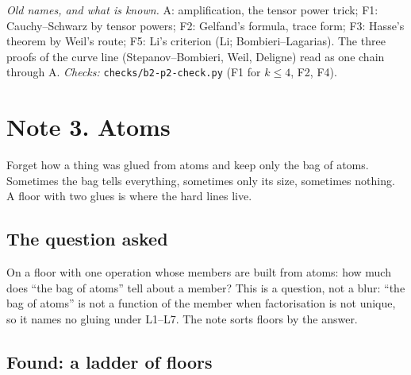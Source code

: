 \noindent\emph{Old names, and what is known.} A: amplification, the tensor power trick; F1: Cauchy--Schwarz by tensor powers; F2: Gelfand's formula, trace form; F3: Hasse's theorem by Weil's route; F5: Li's criterion (Li; Bombieri--Lagarias). The three proofs of the curve line (Stepanov--Bombieri, Weil, Deligne) read as one chain through A. \emph{Checks:} \texttt{checks/b2-p2-check.py} (F1 for $k \le 4$, F2, F4).

\newpage
\section*{Note 3. Atoms}
\begin{center}
{\small Forget how a thing was glued from atoms and keep only the bag of atoms. Sometimes the bag tells everything, sometimes only its size, sometimes nothing. A floor with two glues is where the hard lines live.}
\end{center}

\subsection*{The question asked}

On a floor with one operation whose members are built from atoms: how much does ``the bag of atoms'' tell about a member? This is a question, not a blur: ``the bag of atoms'' is not a function of the member when factorisation is not unique, so it names no gluing under L1--L7. The note sorts floors by the answer.

\subsection*{Found: a ladder of floors}


